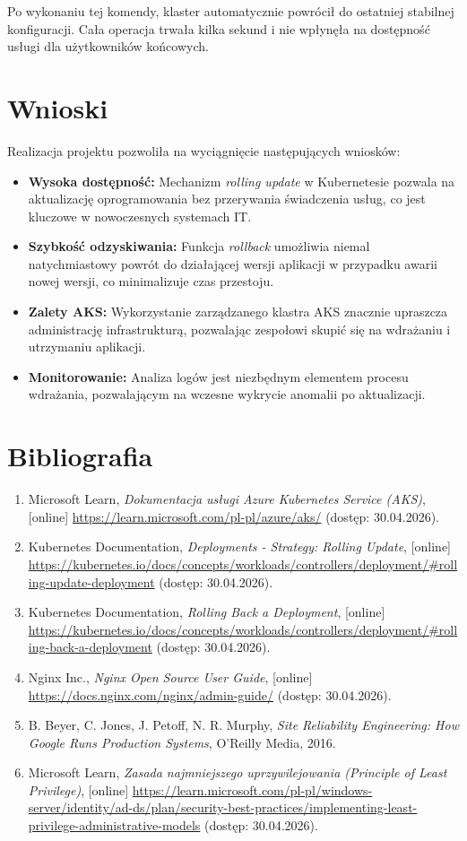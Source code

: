 \documentclass[12pt,a4paper]{article}
\begin{document}
	Po wykonaniu tej komendy, klaster automatycznie powrócił do ostatniej stabilnej konfiguracji. Cała operacja trwała kilka sekund i nie wpłynęła na dostępność usługi dla użytkowników końcowych.


\newpage
\section{Wnioski}
	Realizacja projektu pozwoliła na wyciągnięcie następujących wniosków:
	\begin{itemize}
		\item \textbf{Wysoka dostępność:} Mechanizm \textit{rolling update} w Kubernetesie pozwala na aktualizację oprogramowania bez przerywania świadczenia usług, co jest kluczowe w nowoczesnych systemach IT.
		\item \textbf{Szybkość odzyskiwania:} Funkcja \textit{rollback} umożliwia niemal natychmiastowy powrót do działającej wersji aplikacji w przypadku awarii nowej wersji, co minimalizuje czas przestoju.
		\item \textbf{Zalety AKS:} Wykorzystanie zarządzanego klastra AKS znacznie upraszcza administrację infrastrukturą, pozwalając zespołowi skupić się na wdrażaniu i utrzymaniu aplikacji.
		\item \textbf{Monitorowanie:} Analiza logów jest niezbędnym elementem procesu wdrażania, pozwalającym na wczesne wykrycie anomalii po aktualizacji.
	\end{itemize}





\newpage
\section{Bibliografia}
\begin{enumerate}
	\item Microsoft Learn, \textit{Dokumentacja usługi Azure Kubernetes Service (AKS)}, [online] \url{https://learn.microsoft.com/pl-pl/azure/aks/} (dostęp: 30.04.2026).
	\item Kubernetes Documentation, \textit{Deployments - Strategy: Rolling Update}, [online] \url{https://kubernetes.io/docs/concepts/workloads/controllers/deployment/#rolling-update-deployment} (dostęp: 30.04.2026).
	\item Kubernetes Documentation, \textit{Rolling Back a Deployment}, [online] \url{https://kubernetes.io/docs/concepts/workloads/controllers/deployment/#rolling-back-a-deployment} (dostęp: 30.04.2026).
	\item Nginx Inc., \textit{Nginx Open Source User Guide}, [online] \url{https://docs.nginx.com/nginx/admin-guide/} (dostęp: 30.04.2026).
	\item B. Beyer, C. Jones, J. Petoff, N. R. Murphy, \textit{Site Reliability Engineering: How Google Runs Production Systems}, O'Reilly Media, 2016.
	\item Microsoft Learn, \textit{Zasada najmniejszego uprzywilejowania (Principle of Least Privilege)}, [online] \url{https://learn.microsoft.com/pl-pl/windows-server/identity/ad-ds/plan/security-best-practices/implementing-least-privilege-administrative-models} (dostęp: 30.04.2026).
\end{enumerate}
\end{document}
